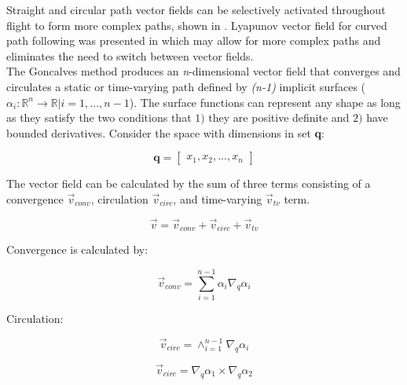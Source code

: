\documentclass[conf]{new-aiaa}
\begin{document}
Straight and circular path vector fields can be selectively activated throughout flight to form more complex paths, shown in \cite{nelson_cooperative_2005,nelson_vector_2006,nelson_vector_2007,jung_unmanned_2016}. Lyapunov vector field for curved path following was presented in \cite{griffiths_vector_2006} which may allow for more complex paths and eliminates the need to switch between vector fields. \\



The Goncalves method produces an \textit{n}-dimensional vector field that converges and circulates a static or time-varying path defined by \textit{(n-1)} implicit surfaces ($\alpha_i:\mathbb{R}^n\rightarrow\mathbb{R} | i=1,...,n-1$). The surface functions can represent any shape as long as they satisfy the two conditions that $1)$ they are positive definite and $2)$ have bounded derivatives. Consider the space with dimensions in set \textbf{q}:

\begin{equation}
\mathbf{q} = \begin{bmatrix} x_1, x_2, ..., x_{n}\end{bmatrix}
\end{equation}

The vector field can be calculated by the sum of three terms consisting of a convergence $\vec{v}_{conv}$, circulation $\vec{v}_{circ}$, and time-varying $\vec{v}_{tv}$ term.


\begin{equation}\label{simpleGVF}
\vec{v} = \vec{v}_{conv} + \vec{v}_{circ} + \vec{v}_{tv} 
\end{equation}	

Convergence is calculated by:

\begin{equation}
\vec{v}_{conv} = \sum_{i=1}^{n-1}\alpha_i\nabla_q\alpha_i  
\label{convOnly}
\end{equation}

Circulation:

\begin{equation}
\vec{v}_{circ} =  \wedge_{i=1}^{n-1}\nabla_q\alpha_i 
\label{circOnly}
\end{equation}

\begin{equation}
\vec{v}_{circ} =  \nabla_q\alpha_1 \times \nabla_q\alpha_2 
\label{circOnlySimp}
\end{equation}
\end{document}

